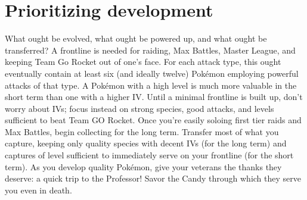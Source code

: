 \section{Prioritizing development}
\label{sec:developmentpriority}
What ought be evolved, what ought be powered up, and what ought be transferred?
A frontline is needed for raiding, Max Battles, Master League, and keeping Team Go Rocket out of one's face.
For each attack type, this ought eventually contain at least six (and ideally twelve) Pokémon
  employing powerful attacks of that type.
A Pokémon with a high level is much more valuable in the short term than one with a higher IV.
Until a minimal frontline is built up, don't worry about IVs; focus instead on strong species,
  good attacks, and levels sufficient to beat Team GO Rocket.
Once you're easily soloing first tier raids and Max Battles, begin collecting for the long term.
Transfer most of what you capture, keeping only quality species with decent IVs (for the long term)
  and captures of level sufficient to immediately serve on your frontline (for the short term).
As you develop quality Pokémon, give your veterans the thanks they deserve: a quick trip to the Professor!
Savor the Candy through which they serve you even in death.
